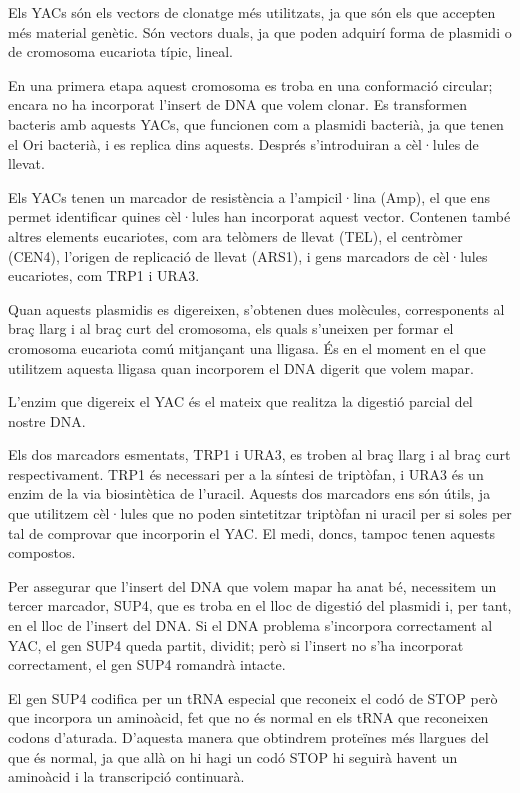 Els YACs són els vectors de clonatge més utilitzats, ja que són els que accepten més material genètic. Són vectors duals, ja que poden adquirí forma de plasmidi o de cromosoma eucariota típic, lineal.

En una primera etapa aquest cromosoma es troba en una conformació circular; encara no ha incorporat l'insert de DNA que volem clonar. Es transformen bacteris amb aquests YACs, que funcionen com a plasmidi bacterià, ja que tenen el Ori bacterià, i es replica dins aquests. Després s'introduiran a cèl·lules de llevat.

Els YACs tenen un marcador de resistència a l'ampicil·lina (Amp), el que ens permet identificar quines cèl·lules han incorporat aquest vector. Contenen també altres elements eucariotes, com ara telòmers de llevat (TEL), el centròmer (CEN4), l'origen de replicació de llevat (ARS1), i gens marcadors de cèl·lules eucariotes, com TRP1 i URA3.

Quan aquests plasmidis es digereixen, s'obtenen dues molècules, corresponents al braç llarg i al braç curt del cromosoma, els quals s'uneixen per formar el cromosoma eucariota comú mitjançant una lligasa. És en el moment en el que utilitzem aquesta lligasa quan incorporem el DNA digerit que volem mapar.

L'enzim que digereix el YAC és el mateix que realitza la digestió parcial del nostre DNA.

Els dos marcadors esmentats, TRP1 i URA3, es troben al braç llarg i al braç curt respectivament. TRP1 és necessari per a la síntesi de triptòfan, i URA3 és un enzim de la via biosintètica de l'uracil. Aquests dos marcadors ens són útils, ja que utilitzem cèl·lules que no poden sintetitzar triptòfan ni uracil per si soles per tal de comprovar que incorporin el YAC. El medi, doncs, tampoc tenen aquests compostos.

Per assegurar que l'insert del DNA que volem mapar ha anat bé, necessitem un tercer marcador, SUP4, que es troba en el lloc de digestió del plasmidi i, per tant, en el lloc de l'insert del DNA. Si el DNA problema s'incorpora correctament al YAC, el gen SUP4 queda partit, dividit; però si l'insert no s'ha incorporat correctament, el gen SUP4 romandrà intacte.

El gen SUP4 codifica per un tRNA especial que reconeix el codó de STOP però que incorpora un aminoàcid, fet que no és normal en els tRNA que reconeixen codons d'aturada. D'aquesta manera que obtindrem proteïnes més llargues del que és normal, ja que allà on hi hagi un codó STOP hi seguirà havent un aminoàcid i la transcripció continuarà.


